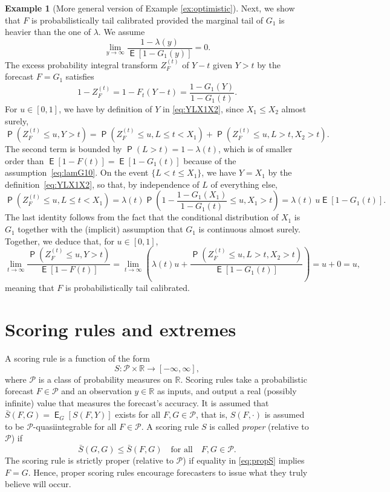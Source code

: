 \documentclass[12pt]{article}
\newcommand{\E}{\operatorname{\mathsf{E}}}
\newcommand{\Q}{\operatorname{\mathsf{P}}}
\newcommand{\R}{\mathbb{R}}
\newcommand{\Pp}{\mathcal{P}}
\newcommand{\1}{\mathbf{1}} %
\newcommand{\ZFt}{Z_{F}^{(t)}} %
\theoremstyle{definition}
\newtheorem{example}[propo]{Example}
\begin{document}
\begin{example}[More general version of Example \ref{ex:optimistic}]
Next, we show that $F$ is probabilistically tail calibrated provided the marginal tail of $G_1$ is heavier than the one of $\lambda$. We assume
\begin{equation}
	\label{eq:lamG10}
	\lim_{y \to \infty} \frac{1-\lambda(y)}{\E[1-G_1(y)]} = 0.
\end{equation}
The excess probability integral transform $\ZFt$ of $Y - t$ given $Y > t$ by the forecast $F = G_1$ satisfies
\[
	1 - \ZFt 
	= 1 - F_t(Y - t) 
	= \frac{1 - G_1(Y)}{1-G_1(t)}.
\]
For $u \in [0, 1]$, we have by definition of $Y$ in \eqref{eq:YLX1X2}, since $X_1 \le X_2$ almost surely,
\[
	\Q( \ZFt \le u, Y > t)
	= \Q ( \ZFt \le u, L \le t < X_1) 
	+ \Q( \ZFt \le u, L > t, X_2 > t).
\]
The second term is bounded by $\Q(L > t) = 1 - \lambda(t)$, which is of smaller order than $\E[1-F(t)] = \E[1-G_1(t)]$ because of the assumption~\eqref{eq:lamG10}. On the event $\{L < t \le X_1\}$, we have $Y = X_1$ by the definition~\eqref{eq:YLX1X2}, so that, by independence of $L$ of everything else,
\[
	\Q \left( \ZFt \le u, L \le t < X_1 \right)
	= \lambda(t) \Q \left( 1 - \frac{1 - G_1(X_1)}{1-G_1(t)} \le u, X_1 > t \right)
	= \lambda(t) \, u \E[1-G_1(t)].
\]
The last identity follows from the fact that the conditional distribution of $X_1$ is $G_1$ together with the (implicit) assumption that $G_1$ is continuous almost surely. Together, we deduce that, for $u \in [0,1]$,
\[
	\lim_{t \to \infty} 
	\frac{\Q \left( \ZFt \le u, Y > t \right)}{\E[1-F(t)]} 
	=
	\lim_{t \to \infty}
	\left( 
	\lambda(t) u + \frac{\Q(\ZFt \le u, L > t, X_2 > t)}{\E[1-G_1(t)]}
	\right)
	= 
	u + 0 = u,
\]
meaning that $F$ is probabilistically tail calibrated.
\end{example}


\section{Scoring rules and extremes}\label{sec:scores}

A scoring rule is a function of the form 
\[
S: \Pp \times \R \to [-\infty, \infty],
\]
where $\Pp$ is a class of probability measures on $\R$. 
Scoring rules take a probabilistic forecast $F \in \Pp$ and an observation $y \in \R$ as inputs, and output a real (possibly infinite) value that measures the forecast's accuracy. It is assumed that $\bar{S}(F, G) = \E_{G}[S(F, Y)]$ exists for all $F,G \in \Pp$, that is, $S(F,\cdot)$ is assumed to be $\Pp$-quasiintegrable for all $F \in \Pp$. A scoring rule $S$ is called \emph{proper} (relative to $\Pp$) if
\begin{equation}\label{eq:propS}
\bar{S}(G, G) \leq \bar{S}(F, G) \quad \text{for all} \quad F, G \in \Pp.
\end{equation}
The scoring rule is strictly proper (relative to $\Pp$) if equality in \eqref{eq:propS} implies $F = G$. Hence, proper scoring rules encourage forecasters to issue what they truly believe will occur. 
\end{document}
